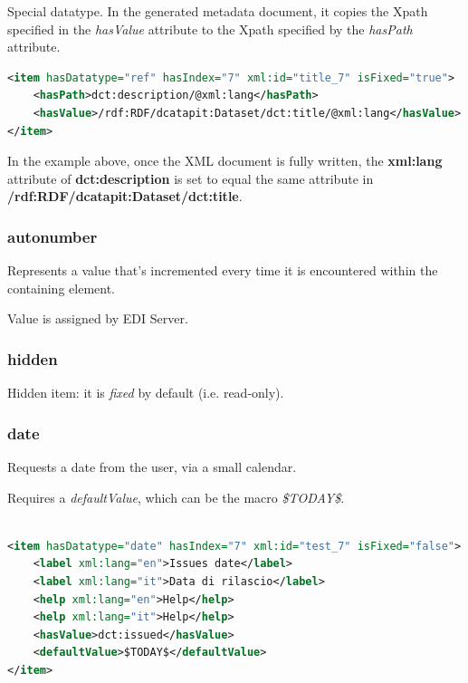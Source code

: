 \documentclass[10pt]{article}
\begin{document}
Special datatype.
In the generated metadata document, it copies the Xpath specified in the \textit{hasValue} attribute to the Xpath specified by the \textit{hasPath} attribute.

\begin{lstlisting}[language=xml]
<item hasDatatype="ref" hasIndex="7" xml:id="title_7" isFixed="true">
	<hasPath>dct:description/@xml:lang</hasPath>
	<hasValue>/rdf:RDF/dcatapit:Dataset/dct:title/@xml:lang</hasValue>
</item>
\end{lstlisting}

In the example above, once the XML document is fully written, the \textbf{xml:lang} attribute of \textbf{dct:description} is set to equal the same attribute in \textbf{/rdf:RDF/dcatapit:Dataset/dct:title}.

\subsubsection{autonumber}
\label{autonumber}

Represents a value that's incremented every time it is encountered within the containing element.

Value is assigned by EDI Server.

\subsubsection{hidden}
\label{hidden}

Hidden item: it is \textit{fixed} by default (i.e. read-only).

\subsubsection{date}
\label{date}

Requests a date from the user, via a small calendar.

Requires a \textit{defaultValue}, which can be the macro \textit{\$TODAY\$}.

\begin{lstlisting}[language=xml]

<item hasDatatype="date" hasIndex="7" xml:id="test_7" isFixed="false">
	<label xml:lang="en">Issues date</label>
	<label xml:lang="it">Data di rilascio</label>
	<help xml:lang="en">Help</help>
	<help xml:lang="it">Help</help>
	<hasValue>dct:issued</hasValue>
	<defaultValue>$TODAY$</defaultValue>
</item>

\end{lstlisting}
\end{document}
